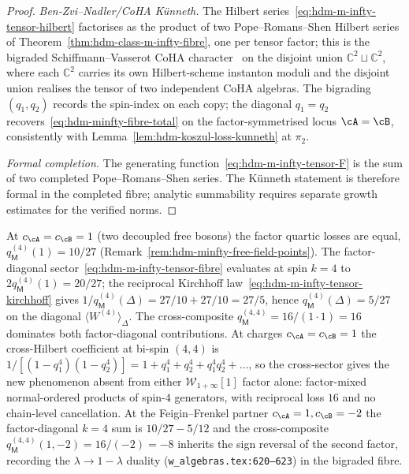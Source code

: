\begin{proof}
\emph{Ben-Zvi--Nadler/CoHA K\"unneth.} The Hilbert
series~\eqref{eq:hdm-m-infty-tensor-hilbert} factorises as the
product of two Pope--Romans--Shen Hilbert series of
Theorem~\ref{thm:hdm-class-m-infty-fibre}, one per tensor factor;
this is the bigraded Schiffmann--Vasserot CoHA
character~\cite{SchiffmannVasserot13} on the disjoint union
$\mathbb C^2\sqcup\mathbb C^2$, where each $\mathbb C^2$ carries its
own Hilbert-scheme instanton moduli and the disjoint union realises
the tensor of two independent CoHA algebras. The bigrading
$(q_1,q_2)$ records the spin-index on each copy; the diagonal
$q_1=q_2$ recovers~\eqref{eq:hdm-minfty-fibre-total} on the
factor-symmetrised locus $\cA=\cB$, consistently with
Lemma~\ref{lem:hdm-koszul-loss-kunneth} at $\pi_2$.

\emph{Formal completion.} The generating
function~\eqref{eq:hdm-m-infty-tensor-F} is the sum of two completed
Pope--Romans--Shen series. The K\"unneth statement is therefore formal
in the completed fibre; analytic summability requires separate growth
estimates for the verified norms.
\end{proof}

\begin{example}
\label{ex:hdm-m-infty-tensor-examples}
At $c_\cA = c_\cB = 1$ (two decoupled free bosons) the factor
quartic losses are equal,
$q_\mathsf M^{(4)}(1) = 10/27$
(Remark~\ref{rem:hdm-minfty-free-field-points}). The
factor-diagonal sector~\eqref{eq:hdm-m-infty-tensor-fibre} evaluates
at spin $k=4$ to $2q_\mathsf M^{(4)}(1) = 20/27$; the reciprocal
Kirchhoff law~\eqref{eq:hdm-m-infty-tensor-kirchhoff} gives
$1/q_\mathsf M^{(4)}(\Delta) = 27/10+27/10 = 27/5$, hence
$q_\mathsf M^{(4)}(\Delta) = 5/27$ on the diagonal $\langle
W^{(4)}\rangle_\Delta$. The cross-composite
$q_\mathsf M^{(4,4)} = 16/(1\cdot 1) = 16$ dominates both
factor-diagonal contributions. At charges $c_\cA = c_\cB = 1$ the
cross-Hilbert coefficient at bi-spin $(4,4)$ is
$1/[(1-q_1^4)(1-q_2^4)] = 1 + q_1^4 + q_2^4 + q_1^4 q_2^4 + \ldots$,
so the cross-sector gives the new phenomenon absent from either
$\mathcal W_{1+\infty}[1]$ factor alone: factor-mixed
normal-ordered products of spin-$4$ generators, with reciprocal
loss $16$ and no chain-level cancellation. At the Feigin--Frenkel
partner $c_\cA = 1, c_\cB = -2$ the factor-diagonal $k=4$ sum is
$10/27 - 5/12$ and the cross-composite $q_\mathsf M^{(4,4)}(1,-2)
= 16/(-2) = -8$ inherits the sign reversal of the second factor,
recording the $\lambda\to 1-\lambda$ duality
(\texttt{w\_algebras.tex:620--623}) in the bigraded fibre.
\end{example}

